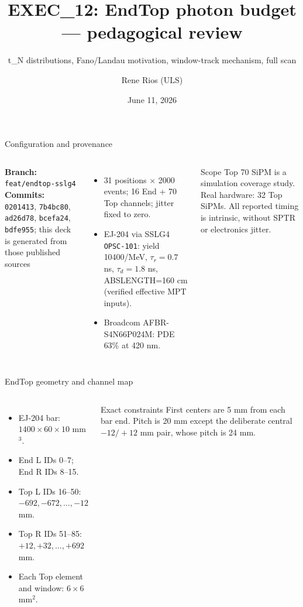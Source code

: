 \documentclass[aspectratio=169]{beamer}
\title{EXEC\_12: EndTop photon budget --- pedagogical review}
\subtitle{t_N distributions, Fano/Landau motivation, window-track mechanism, full scan}
\author{Rene Rios (ULS)}
\date{June 11, 2026}
\begin{document}
\begin{frame}{Configuration and provenance}

\begin{columns}[T]
\textbf{Branch:} \texttt{feat/endtop-sslg4}\\
\textbf{Commits:} \texttt{0201413}, \texttt{7b4bc80}, \texttt{ad26d78},
\texttt{bcefa24}, \texttt{bdfe955}; this deck is generated from those published sources
\begin{itemize}\small
  \item 31 positions $\times$ 2000 events; 16 End + 70 Top channels; jitter fixed to zero.
  \item EJ-204 via SSLG4 \texttt{OPSC-101}: yield 10400/MeV, $\tau_r=0.7$ ns,
        $\tau_d=1.8$ ns, ABSLENGTH=160 cm (verified effective MPT inputs).
  \item Broadcom AFBR-S4N66P024M: PDE 63\% at 420 nm.
\end{itemize}
\begin{alertblock}{Scope}
Top 70 SiPM is a simulation coverage study. Real hardware: 32 Top SiPMs.
All reported timing is intrinsic, without SPTR or electronics jitter.
\end{alertblock}
\end{columns}

\end{frame}
\begin{frame}{EndTop geometry and channel map}

\begin{columns}[T]
\begin{itemize}
 \item EJ-204 bar: $1400\times60\times10$ mm$^3$.
 \item End L IDs 0--7; End R IDs 8--15.
 \item Top L IDs 16--50: $-692,-672,\ldots,-12$ mm.
 \item Top R IDs 51--85: $+12,+32,\ldots,+692$ mm.
 \item Each Top element and window: $6\times6$ mm$^2$.
\end{itemize}
\begin{block}{Exact constraints}
First centers are 5 mm from each bar end. Pitch is 20 mm except the deliberate
central $-12/+12$ mm pair, whose pitch is 24 mm.
\end{block}
\end{columns}

\end{frame}
\end{document}
